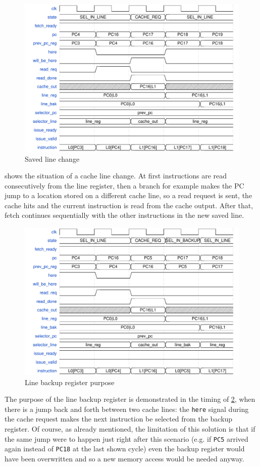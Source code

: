 \begin{figure}[!h]
  \centering
  \includegraphics[scale=.6]{img/fetch06.pdf}
  \caption{Saved line change}
  \label{fig:fetch06}
\end{figure}
 shows the situation of a cache line change. At first instructions are read consecutively from the line register, then a branch for example makes the \ac{PC} jump to a location stored on a different cache line, so a read request is sent, the cache hits and the current instruction is read from the cache output. After that, fetch continues sequentially with the other instructions in the new saved line.

\begin{figure}[!h]
  \centering
  \includegraphics[scale=.6]{img/fetch09.pdf}
  \caption{Line backup register purpose}
  \label{fig:fetch09}
\end{figure}
The purpose of the line backup register is demonstrated in the timing of \cref{fig:fetch09}, when there is a jump back and forth between two cache lines: the \texttt{here} signal during the cache request makes the next instruction be selected from the backup register. Of course, as already mentioned, the limitation of this solution is that if the same jump were to happen just right after this scenario (e.g. if \texttt{PC5} arrived again instead of \texttt{PC18} at the last shown cycle) even the backup register would have been overwritten and so a new memory access would be needed anyway.


